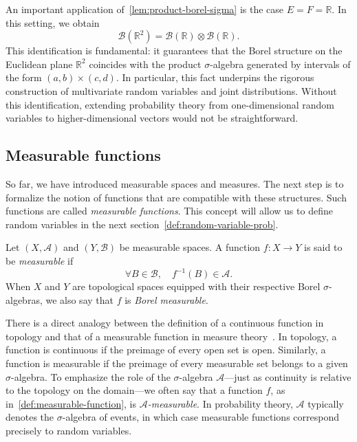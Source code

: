 \begin{remarknl}
    An important application of~\ref{lem:product-borel-sigma} is the case $E = F = \mathbb{R}$. In this setting, we obtain
    \[
        \mathcal{B}(\mathbb{R}^2) = \mathcal{B}(\mathbb{R}) \otimes \mathcal{B}(\mathbb{R}).
    \]
    This identification is fundamental: it guarantees that the Borel structure on the Euclidean plane $\mathbb{R}^2$ coincides with the product $\sigma$-algebra generated by intervals of the form $(a, b) \times (c, d)$. In particular, this fact underpins the rigorous construction of multivariate random variables and joint distributions. Without this identification, extending probability theory from one-dimensional random variables to higher-dimensional vectors would not be straightforward.
\end{remarknl}

\subsection{Measurable functions}\label{subsec:measurable-functions}

So far, we have introduced measurable spaces and measures. The next step is to formalize the notion of functions that are compatible with these structures. Such functions are called \emph{measurable functions}. This concept will allow us to define random variables in the next section~\ref{def:random-variable-prob}.

\begin{definition}
    \label{def:measurable-function}
    Let $(X, \mathcal{A})$ and $(Y, \mathcal{B})$ be measurable spaces. A function $f : X \to Y$ is said to be \emph{measurable} if
    \[
        \forall B \in \mathcal{B}, \quad f^{-1}(B) \in \mathcal{A}.
    \]
    When $X$ and $Y$ are topological spaces equipped with their respective Borel $\sigma$-algebras, we also say that $f$ is \emph{Borel measurable}.
\end{definition}

There is a direct analogy between the definition of a continuous function in topology and that of a measurable function in measure theory~\cite[Cor.~2.2]{FollandRealAnalysis}. In topology, a function is continuous if the preimage of every open set is open. Similarly, a function is measurable if the preimage of every measurable set belongs to a given $\sigma$-algebra. To emphasize the role of the $\sigma$-algebra $\mathcal{A}$—just as continuity is relative to the topology on the domain—we often say that a function $f$, as in~\ref{def:measurable-function}, is \emph{$\mathcal{A}$-measurable}. In probability theory, $\mathcal{A}$ typically denotes the $\sigma$-algebra of events, in which case measurable functions correspond precisely to random variables.

